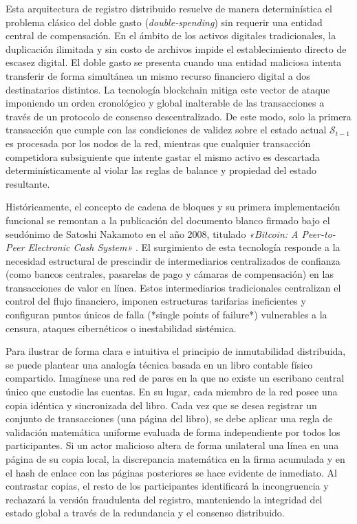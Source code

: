 Esta arquitectura de registro distribuido resuelve de manera determinística el problema clásico del doble gasto (\textit{double-spending}) sin requerir una entidad central de compensación. En el ámbito de los activos digitales tradicionales, la duplicación ilimitada y sin costo de archivos impide el establecimiento directo de escasez digital. El doble gasto se presenta cuando una entidad maliciosa intenta transferir de forma simultánea un mismo recurso financiero digital a dos destinatarios distintos. La tecnología blockchain mitiga este vector de ataque imponiendo un orden cronológico y global inalterable de las transacciones a través de un protocolo de consenso descentralizado. De este modo, solo la primera transacción que cumple con las condiciones de validez sobre el estado actual $\mathcal{S}_{t-1}$ es procesada por los nodos de la red, mientras que cualquier transacción competidora subsiguiente que intente gastar el mismo activo es descartada determinísticamente al violar las reglas de balance y propiedad del estado resultante.

Históricamente, el concepto de cadena de bloques y su primera implementación funcional se remontan a la publicación del documento blanco firmado bajo el seudónimo de Satoshi Nakamoto en el año 2008, titulado \textit{«Bitcoin: A Peer-to-Peer Electronic Cash System»} \cite{nakamoto2008bitcoin}. El surgimiento de esta tecnología responde a la necesidad estructural de prescindir de intermediarios centralizados de confianza (como bancos centrales, pasarelas de pago y cámaras de compensación) en las transacciones de valor en línea. Estos intermediarios tradicionales centralizan el control del flujo financiero, imponen estructuras tarifarias ineficientes y configuran puntos únicos de falla (*single points of failure*) vulnerables a la censura, ataques cibernéticos o inestabilidad sistémica.

Para ilustrar de forma clara e intuitiva el principio de inmutabilidad distribuida, se puede plantear una analogía técnica basada en un libro contable físico compartido. Imagínese una red de pares en la que no existe un escribano central único que custodie las cuentas. En su lugar, cada miembro de la red posee una copia idéntica y sincronizada del libro. Cada vez que se desea registrar un conjunto de transacciones (una página del libro), se debe aplicar una regla de validación matemática uniforme evaluada de forma independiente por todos los participantes. Si un actor malicioso altera de forma unilateral una línea en una página de su copia local, la discrepancia matemática en la firma acumulada y en el hash de enlace con las páginas posteriores se hace evidente de inmediato. Al contrastar copias, el resto de los participantes identificará la incongruencia y rechazará la versión fraudulenta del registro, manteniendo la integridad del estado global a través de la redundancia y el consenso distribuido.

